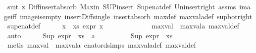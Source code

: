 \begin{isabellebody}
\ {\isacharparenleft}{\kern0pt}smt\ {\isacharparenleft}{\kern0pt}z{}{\isacharparenright}{\kern0pt}\ Diff{\isacharunderscore}{\kern0pt}insert{\isacharunderscore}{\kern0pt}absorb\ Max{\isacharunderscore}{\kern0pt}in\ SUP{\isacharunderscore}{\kern0pt}insert\ Sup{\isacharunderscore}{\kern0pt}enat{\isacharunderscore}{\kern0pt}def\ Un{\isacharunderscore}{\kern0pt}insert{\isacharunderscore}{\kern0pt}right\ assms\ image{\isacharunderscore}{\kern0pt}iff\ image{\isacharunderscore}{\kern0pt}is{\isacharunderscore}{\kern0pt}empty\ insert{\isacharunderscore}{\kern0pt}Diff{\isacharunderscore}{\kern0pt}single\ insert{\isacharunderscore}{\kern0pt}absorb\ max{\isacharunderscore}{\kern0pt}def\ max{\isacharunderscore}{\kern0pt}val{\isacharunderscore}{\kern0pt}a{\isacharunderscore}{\kern0pt}def\ sup{\isacharunderscore}{\kern0pt}bot{\isacharunderscore}{\kern0pt}right\ sup{\isacharunderscore}{\kern0pt}enat{\isacharunderscore}{\kern0pt}def{\isacharparenright}{\kern0pt}\isanewline
\ \ \ \ \isamarkupfalse%
\ {\isachardoublequoteopen}{\isasymforall}x\ {\isasymin}\ xs{\isachardot}{\kern0pt}\ expr{\isacharunderscore}{\kern0pt}{}\ x\ {\isacharless}{\kern0pt}\ {\isasyminfinity}{\isachardoublequoteclose}\ \isamarkupfalse%
\ {}\ \isanewline
\ \ \ \ \ \ \isamarkupfalse%
\ {\isacartoucheopen}max{\isacharunderscore}{\kern0pt}val\ {\isasymle}\ max{\isacharunderscore}{\kern0pt}val{\isacharunderscore}{\kern0pt}a{\isacartoucheclose}\ max{\isacharunderscore}{\kern0pt}val{\isacharunderscore}{\kern0pt}def\ \isamarkupfalse%
\ auto\isanewline
\ \ \ \ \isamarkupfalse%
\ {\isachardoublequoteopen}Sup\ {\isacharparenleft}{\kern0pt}expr{\isacharunderscore}{\kern0pt}{}\ {\isacharbackquote}{\kern0pt}\ {\isacharparenleft}{\kern0pt}xs\ {\isasymunion}\ {\isacharbraceleft}{\kern0pt}a{\isacharbraceright}{\kern0pt}{\isacharparenright}{\kern0pt}{\isacharparenright}{\kern0pt}\ {\isacharequal}{\kern0pt}\ {\isasyminfinity}{\isachardoublequoteclose}\isanewline
\ \ \ \ \ \ \isamarkupfalse%
\ {\isacartoucheopen}Sup\ {\isacharparenleft}{\kern0pt}expr{\isacharunderscore}{\kern0pt}{}\ {\isacharbackquote}{\kern0pt}\ xs{\isacharparenright}{\kern0pt}\ {\isacharequal}{\kern0pt}\ {\isasyminfinity}{\isacartoucheclose}\ \isanewline
\ \ \ \ \ \ \isamarkupfalse%
\ {\isacharparenleft}{\kern0pt}metis\ {\isacartoucheopen}max{\isacharunderscore}{\kern0pt}val\ {\isasymle}\ max{\isacharunderscore}{\kern0pt}val{\isacharunderscore}{\kern0pt}a{\isacartoucheclose}\ enat{\isacharunderscore}{\kern0pt}ord{\isacharunderscore}{\kern0pt}simps{\isacharparenleft}{\kern0pt}{}{\isacharparenright}{\kern0pt}\ max{\isacharunderscore}{\kern0pt}val{\isacharunderscore}{\kern0pt}a{\isacharunderscore}{\kern0pt}def\ max{\isacharunderscore}{\kern0pt}val{\isacharunderscore}{\kern0pt}def{\isacharparenright}{\kern0pt}\isanewline

\end{isabellebody}
